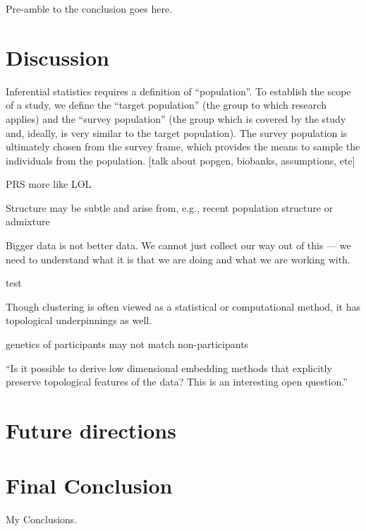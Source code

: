 Pre-amble to the conclusion goes here.

\section{Discussion}

Inferential statistics requires a definition of ``population''\citep{statcan2003}. To establish the scope of a study, we define the ``target population'' (the group to which research applies) and the ``survey population'' (the group which is covered by the study and, ideally, is very similar to the target population). The survey population is ultimately chosen from the survey frame, which provides the means to sample the individuals from the population. [talk about popgen, biobanks, assumptions, etc]

PRS more like LOL\citep{kaplan_polygenic_2022}

Structure may be subtle and arise from, e.g., recent population structure or admixture\citep{gopalan_human_2022}

Bigger data is not better data. We cannot just collect our way out of this --- we need to understand what it is that we are doing and what we are working with.

test\citep{rose_sick_2001}

Though clustering is often viewed as a statistical or computational method, it has topological underpinnings as well.

genetics of participants may not match non-participants
\citep{benonisdottir_studying_2023}

``Is it possible to derive low dimensional embedding methods that explicitly preserve topological features of the data? This is an interesting open question.''\citep{wasserman_topological_2018}

\section{Future directions}

\section{Final Conclusion}
My Conclusions.